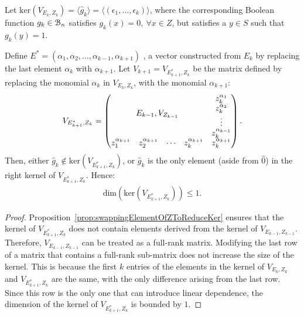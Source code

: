 \documentclass[11pt]{llncs}
\begin{document}
\begin{proposition}\label{prop:constructionOfNextVRemovingAlphai}
    Let $\text{ker}(V_{E_k, Z_k}) =  \langle \hat{g}_k \rangle = \langle (\epsilon_1, \dots, \epsilon_k) \rangle$, where the corresponding Boolean function $g_k\in \mathcal{B}_{n}$ satisfies $g_k(x) = 0,\ \forall x\in Z$, but satisfies a $y\in S$ such that $g_k(y) = 1$.
    
    Define $E^{*} = (\alpha_1, \alpha_2, \dots, \alpha_{k-1}, \alpha_{k+1})$ , a vector constructed from $E_k$ by replacing the last element $\alpha_{k}$ with $\alpha_{k+1}$. 
    Let $V_{k+1} = V_{E^{*}_{k+1}, Z_k}$ be the matrix defined by replacing the monomial $\alpha_k$ in $V_{E_k, Z_k}$, with the monomial $\alpha_{k+1}$: 
    \begin{align*}
        V_{E^{*}_{k+1}, Z_{k}} = 
        \begin{pmatrix}
        \multicolumn{4}{c}{\multirow{4}{*}{$E_{k-1}, V_{Z_{k-1}}$}} & z_{k}^{\alpha_{1}}\\
        & & & & z_{k}^{\alpha_{2}}\\
        & & & & \vdots\\
        & & & & z_{k}^{\alpha_{k-1}}\\
        z_{1}^{\alpha_{k+1}} & z_{2}^{\alpha_{k+1}}& \cdots & z_{k}^{\alpha_{k+1}} & z_{k}^{\alpha_{k+1}}
    \end{pmatrix}.
    \end{align*}
    Then, either $\hat{g}_k \not\in \text{ker}(V_{E^{*}_{k+1}, Z_k})$, or $\hat{g}_k$ is the only element (aside from $\hat{0}$) in the right kernel of $V_{E_{k+1}^{*}, Z_k}$. Hence:
    \begin{align*}
        \text{dim}\left(\text{ker}(V_{E^{*}_{k+1}, Z_k})\right)\leq 1. 
    \end{align*}

\end{proposition}
\begin{proof}

    Proposition~\ref{prop:swappingElementOfZToReduceKer} ensures that the kernel of $V_{E^{*}_{k+1}, Z_{k}}$ does not contain elements derived from the kernel of $V_{ E_{k-1}, Z_{k-1}}$. 
    Therefore, $V_{E_{k-1}, Z_{k-1}}$ can be treated as a full-rank matrix.
    Modifying the last row of a matrix that contains a full-rank sub-matrix does not increase the size of the kernel. This is because the first $k$ entries of the elements in the kernel of $V_{E_k, Z_k }$ and $V_{E^{*}_{k+1}, Z_k}$ are the same, with the only difference arising from the last row. 
    Since this row is the only one that can introduce linear dependence, the dimension of the kernel of $V_{ E^{*}_{k+1}, Z_k}$ is bounded by $1$.
\end{proof}
\end{document}
